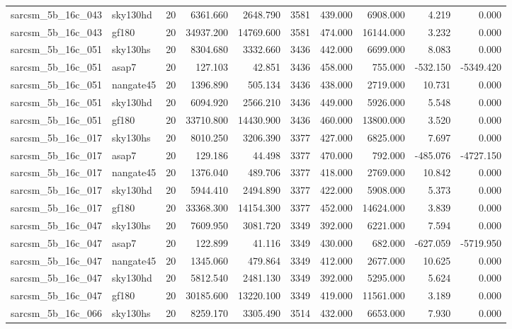 \begin{tabular}{llrrrrrrrr}
sarcsm\_5b\_16c\_043 & sky130hd & 20 & 6361.660 & 2648.790 & 3581 & 439.000 & 6908.000 & 4.219 & 0.000 \\
sarcsm\_5b\_16c\_043 & gf180 & 20 & 34937.200 & 14769.600 & 3581 & 474.000 & 16144.000 & 3.232 & 0.000 \\
sarcsm\_5b\_16c\_051 & sky130hs & 20 & 8304.680 & 3332.660 & 3436 & 442.000 & 6699.000 & 8.083 & 0.000 \\
sarcsm\_5b\_16c\_051 & asap7 & 20 & 127.103 & 42.851 & 3436 & 458.000 & 755.000 & -532.150 & -5349.420 \\
sarcsm\_5b\_16c\_051 & nangate45 & 20 & 1396.890 & 505.134 & 3436 & 438.000 & 2719.000 & 10.731 & 0.000 \\
sarcsm\_5b\_16c\_051 & sky130hd & 20 & 6094.920 & 2566.210 & 3436 & 449.000 & 5926.000 & 5.548 & 0.000 \\
sarcsm\_5b\_16c\_051 & gf180 & 20 & 33710.800 & 14430.900 & 3436 & 460.000 & 13800.000 & 3.520 & 0.000 \\
sarcsm\_5b\_16c\_017 & sky130hs & 20 & 8010.250 & 3206.390 & 3377 & 427.000 & 6825.000 & 7.697 & 0.000 \\
sarcsm\_5b\_16c\_017 & asap7 & 20 & 129.186 & 44.498 & 3377 & 470.000 & 792.000 & -485.076 & -4727.150 \\
sarcsm\_5b\_16c\_017 & nangate45 & 20 & 1376.040 & 489.706 & 3377 & 418.000 & 2769.000 & 10.842 & 0.000 \\
sarcsm\_5b\_16c\_017 & sky130hd & 20 & 5944.410 & 2494.890 & 3377 & 422.000 & 5908.000 & 5.373 & 0.000 \\
sarcsm\_5b\_16c\_017 & gf180 & 20 & 33368.300 & 14154.300 & 3377 & 452.000 & 14624.000 & 3.839 & 0.000 \\
sarcsm\_5b\_16c\_047 & sky130hs & 20 & 7609.950 & 3081.720 & 3349 & 392.000 & 6221.000 & 7.594 & 0.000 \\
sarcsm\_5b\_16c\_047 & asap7 & 20 & 122.899 & 41.116 & 3349 & 430.000 & 682.000 & -627.059 & -5719.950 \\
sarcsm\_5b\_16c\_047 & nangate45 & 20 & 1345.060 & 479.864 & 3349 & 412.000 & 2677.000 & 10.625 & 0.000 \\
sarcsm\_5b\_16c\_047 & sky130hd & 20 & 5812.540 & 2481.130 & 3349 & 392.000 & 5295.000 & 5.624 & 0.000 \\
sarcsm\_5b\_16c\_047 & gf180 & 20 & 30185.600 & 13220.100 & 3349 & 419.000 & 11561.000 & 3.189 & 0.000 \\
sarcsm\_5b\_16c\_066 & sky130hs & 20 & 8259.170 & 3305.490 & 3514 & 432.000 & 6653.000 & 7.930 & 0.000 \\

\end{tabular}
